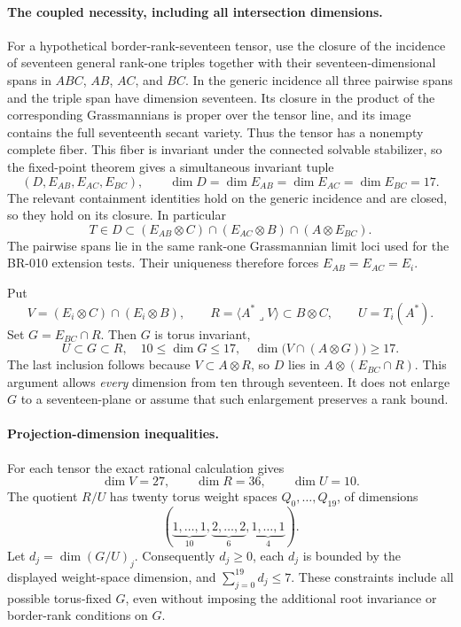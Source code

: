 \paragraph{The coupled necessity, including all intersection dimensions.}
For a hypothetical border-rank-seventeen tensor, use the closure of the
incidence of seventeen general rank-one triples together with their
seventeen-dimensional spans in $ABC$, $AB$, $AC$, and $BC$.  In the
generic incidence all three pairwise spans and the triple span have
dimension seventeen.  Its closure in the product of the corresponding
Grassmannians is proper over the tensor line, and its image contains the
full seventeenth secant variety.  Thus the tensor has a nonempty complete
fiber.  This fiber is invariant under the connected solvable stabilizer,
so the fixed-point theorem gives a simultaneous invariant tuple
\[
 (D,E_{AB},E_{AC},E_{BC}),\qquad\dim D=\dim E_{AB}=\dim E_{AC}=\dim E_{BC}=17.
\]
The relevant containment identities hold on the generic incidence and
are closed, so they hold on its closure.  In particular
\[
 T\in D\subset(E_{AB}\otimes C)\cap(E_{AC}\otimes B)
                 \cap(A\otimes E_{BC}).
\]
The pairwise spans lie in the same rank-one Grassmannian limit loci used
for the BR-010 extension tests.  Their uniqueness therefore forces
$E_{AB}=E_{AC}=E_i$.

Put
\[
 V=(E_i\otimes C)\cap(E_i\otimes B),\qquad
 R=\langle A^*\mathbin{\lrcorner}V\rangle\subset B\otimes C,
 \qquad U=T_i(A^*).
\]
Set $G=E_{BC}\cap R$.  Then $G$ is torus invariant,
\[
 U\subset G\subset R,\quad 10\le\dim G\le17,\quad
 \dim\bigl(V\cap(A\otimes G)\bigr)\ge17.
\]
The last inclusion follows because $V\subset A\otimes R$, so $D$ lies
in $A\otimes(E_{BC}\cap R)$.  This argument allows \emph{every}
dimension from ten through seventeen.  It does not enlarge $G$ to a
seventeen-plane or assume that such enlargement preserves a rank bound.

\paragraph{Projection-dimension inequalities.}
For each tensor the exact rational calculation gives
\[
 \dim V=27,\qquad\dim R=36,\qquad\dim U=10.
\]
The quotient $R/U$ has twenty torus weight spaces $Q_0,\ldots,Q_{19}$,
of dimensions
\[
 (\underbrace{1,\ldots,1}_{10},
  \underbrace{2,\ldots,2}_{6},
  \underbrace{1,\ldots,1}_{4}).
\]
Let $d_j=\dim(G/U)_j$.  Consequently $d_j\ge0$, each $d_j$ is bounded
by the displayed weight-space dimension, and
$\sum_{j=0}^{19}d_j\le7$.  These constraints include all possible
torus-fixed $G$, even without imposing the additional root invariance or
border-rank conditions on $G$.

